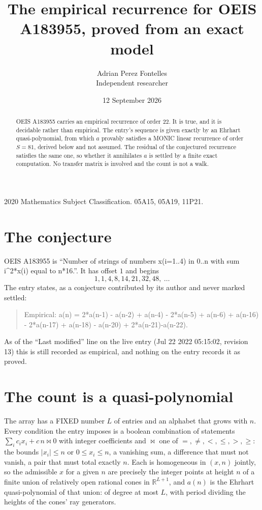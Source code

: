\documentclass[11pt,a4paper]{article}
\title{The empirical recurrence for OEIS A183955, proved from an exact model}
\author{Adrian Perez Fontelles\\ \small Independent researcher}
\date{12 September 2026}
\theoremstyle{plain}
\theoremstyle{definition}
\begin{document}
\maketitle

\begin{abstract}
OEIS A183955 carries an empirical recurrence of order $22$. It is true, and it is
decidable rather than empirical. The entry's sequence is given exactly by an Ehrhart quasi-polynomial, from
which $a$ provably satisfies a MONIC linear recurrence of order $S=81$, derived below and not
assumed. The residual of the conjectured recurrence satisfies the same one, so whether it
annihilates $a$ is settled by a finite exact computation. No transfer matrix is involved and
the count is not a walk.
\end{abstract}

\noindent\small 2020 Mathematics Subject Classification. 05A15, 05A19, 11P21.\normalsize

\section{The conjecture}

OEIS A183955 is ``Number of strings of numbers x(i=1..4) in 0..n with sum i\^{}2*x(i) equal to n*16.''. It has offset $1$ and begins
\[
1, 1, 4, 8, 14, 21, 32, 48,\ \dots
\]
The entry states, as a conjecture contributed by its author and never marked settled:
\begin{quote}
Empirical: a(n) = 2*a(n-1) - a(n-2) + a(n-4) - 2*a(n-5) + a(n-6) + a(n-16) - 2*a(n-17) + a(n-18) - a(n-20) + 2*a(n-21)-a(n-22).
\end{quote}
As of the ``Last modified'' line on the live entry (Jul 22 2022 05:15:02, revision 13)
this is still recorded as empirical, and nothing on the entry records it as proved.

\section{The count is a quasi-polynomial}

The array has a FIXED number $L$ of entries and an alphabet that grows with $n$. Every
condition the entry imposes is a boolean combination of statements
$\sum_i c_ix_i + c\,n \bowtie 0$ with integer coefficients and $\bowtie$ one of
$=,\ne,<,\le,>,\ge$: the bounds $|x_i|\le n$ or $0\le x_i\le n$, a vanishing sum, a difference
that must not vanish, a pair that must total exactly $n$. Each is homogeneous in $(x,n)$
jointly, so the admissible $x$ for a given $n$ are precisely the integer points at height $n$
of a finite union of relatively open rational cones in $\mathbb{R}^{L+1}$, and $a(n)$ is
the Ehrhart quasi-polynomial of that union: of degree at most $L$, with period dividing the
heights of the cones' ray generators.
\end{document}
